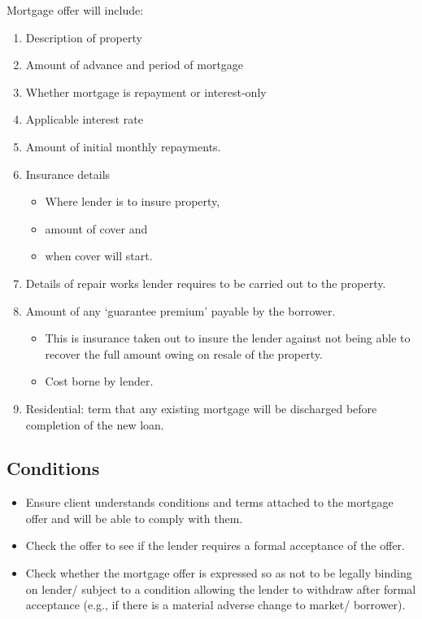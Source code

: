 \documentclass[
]{article}
\providecommand{\tightlist}{%
  \setlength{\itemsep}{0pt}\setlength{\parskip}{0pt}}
\begin{document}
Mortgage offer will include:

\begin{enumerate}
\def\labelenumi{\arabic{enumi}.}
\tightlist
\item
  Description of property
\item
  Amount of advance and period of mortgage
\item
  Whether mortgage is repayment or interest-only
\item
  Applicable interest rate
\item
  Amount of initial monthly repayments.
\item
  Insurance details

  \begin{itemize}
  \tightlist
  \item
    Where lender is to insure property,
  \item
    amount of cover and
  \item
    when cover will start.
  \end{itemize}
\item
  Details of repair works lender requires to be carried out to the
  property.
\item
  Amount of any `guarantee premium' payable by the borrower.

  \begin{itemize}
  \tightlist
  \item
    This is insurance taken out to insure the lender against not being
    able to recover the full amount owing on resale of the property.
  \item
    Cost borne by lender.
  \end{itemize}
\item
  Residential: term that any existing mortgage will be discharged before
  completion of the new loan.
\end{enumerate}

\hypertarget{conditions}{%
\subsection{Conditions}\label{conditions}}

\begin{itemize}
\tightlist
\item
  Ensure client understands conditions and terms attached to the
  mortgage offer and will be able to comply with them.
\item
  Check the offer to see if the lender requires a formal acceptance of
  the offer.
\item
  Check whether the mortgage offer is expressed so as not to be legally
  binding on lender/ subject to a condition allowing the lender to
  withdraw after formal acceptance (e.g., if there is a material adverse
  change to market/ borrower).
\end{itemize}
\end{document}
